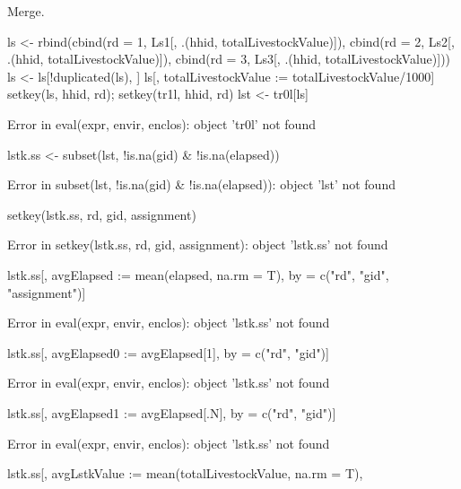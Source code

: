 Merge.
\begin{Schunk}
\begin{Sinput}
ls <- rbind(cbind(rd = 1, Ls1[, .(hhid, totalLivestockValue)]),
	cbind(rd = 2, Ls2[, .(hhid, totalLivestockValue)]),
	cbind(rd = 3, Ls3[, .(hhid, totalLivestockValue)]))
ls <- ls[!duplicated(ls), ]
ls[, totalLivestockValue := totalLivestockValue/1000]
setkey(ls, hhid, rd); setkey(tr1l, hhid, rd)
lst <- tr0l[ls]
\end{Sinput}
\begin{Soutput}
Error in eval(expr, envir, enclos): object 'tr0l' not found
\end{Soutput}
\end{Schunk}
\begin{Schunk}
\begin{Sinput}
lstk.ss <- subset(lst, !is.na(gid) & !is.na(elapsed))
\end{Sinput}
\begin{Soutput}
Error in subset(lst, !is.na(gid) & !is.na(elapsed)): object 'lst' not found
\end{Soutput}
\begin{Sinput}
setkey(lstk.ss, rd, gid, assignment)
\end{Sinput}
\begin{Soutput}
Error in setkey(lstk.ss, rd, gid, assignment): object 'lstk.ss' not found
\end{Soutput}
\begin{Sinput}
lstk.ss[, avgElapsed := mean(elapsed, na.rm = T), by = c("rd", "gid", "assignment")]
\end{Sinput}
\begin{Soutput}
Error in eval(expr, envir, enclos): object 'lstk.ss' not found
\end{Soutput}
\begin{Sinput}
lstk.ss[, avgElapsed0 := avgElapsed[1], by = c("rd", "gid")]
\end{Sinput}
\begin{Soutput}
Error in eval(expr, envir, enclos): object 'lstk.ss' not found
\end{Soutput}
\begin{Sinput}
lstk.ss[, avgElapsed1 := avgElapsed[.N], by = c("rd", "gid")]
\end{Sinput}
\begin{Soutput}
Error in eval(expr, envir, enclos): object 'lstk.ss' not found
\end{Soutput}
\begin{Sinput}
lstk.ss[, avgLstkValue := mean(totalLivestockValue, na.rm = T), 

\end{Sinput}
\end{Schunk}
